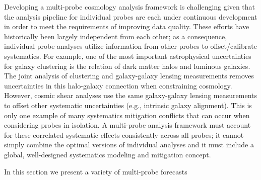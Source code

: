Developing a multi-probe cosmology analysis framework is challenging given that the analysis pipeline for individual probes are each under continuous development in order to meet the requirements of improving data quality. These efforts have historically been largely independent from each other; as a consequence, individual probe analyses utilize information from other probes to offset/calibrate systematics. 
For example, one of the most important astrophysical uncertainties for galaxy clustering is the relation of dark matter halos and luminous galaxies. The joint analysis of clustering and galaxy-galaxy lensing measurements removes uncertainties in this halo-galaxy connection when constraining cosmology. However, cosmic shear analyses use the same galaxy-galaxy lensing measurements to offset other systematic uncertainties (e.g., intrinsic galaxy alignment). This is only one example of many systematics mitigation conflicts that can occur when considering probes in isolation. A multi-probe analysis framework must account for these correlated systematic effects consistently across all probes; it cannot simply combine the optimal versions of individual analyses and it must include a global, well-designed systematics modeling and mitigation concept.

In this section we present a variety of multi-probe forecasts 






